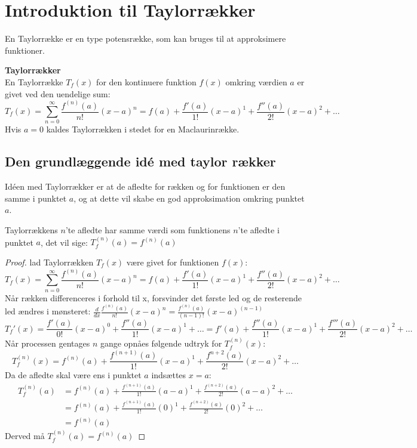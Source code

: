 \chapter{Introduktion til Taylorrækker}
\label{ch:tr}
En Taylorrække er en type potensrække, som kan bruges til at approksimere funktioner.
\begin{defn}
    \textbf{Taylorrækker}\\
    En Taylorrække $T_f(x)$ for den kontinuere funktion $f(x)$ omkring værdien $a$ er givet ved den uendelige sum:
    \[
        T_f(x) = \sum^{\infty}_{n=0} \frac{f^{(n)}(a)}{n!} (x-a)^{n}
        = f(a) + \frac{f'(a)}{1!}(x-a)^{1} + \frac{f''(a)}{2!}(x-a)^{2} + \ldots
    \]
    Hvis $a = 0$ kaldes Taylorrækken i stedet for en Maclaurinrække.
\end{defn}
\section{Den grundlæggende idé med taylor rækker}
\label{def:taylorrække} Idéen med Taylorrækker er at de afledte for rækken og for funktionen er den samme i punktet $a$, 
og at dette vil skabe en god approksimation omkring punktet $a$. 
\begin{thm}
    Taylorrækkens $n$'te afledte har samme værdi som funktionens $n$'te afledte i punktet $a$, 
    det vil sige: $T_f^{(n)}(a) = f^{(n)} (a)$
\end{thm}
\begin{proof}
    lad Taylorrækken $T_f(x)$ være givet for funktionen $f(x)$: 
    \[
        T_f(x) = \sum^{\infty}_{n=0} \frac{f^{(n)}(a)}{n!} (x-a)^{n}
        = f(a) + \frac{f'(a)}{1!}(x-a)^{1} + \frac{f''(a)}{2!}(x-a)^{2} + \ldots
    \]
    Når rækken differenceres i forhold til x, forsvinder det første led og de resterende led ændres i mønsteret: $\frac{d}{dx} \frac{f^{(n)}(a)}{n!} (x-a)^{n} = \frac{f^{(n)}(a)}{(n-1)!} (x-a)^{(n - 1)}$ %
    \[
        T_f'(x) = \frac{f'(a)}{0!}(x-a)^0 + \frac{f''(a)}{1!}(x-a)^{1} + \ldots = f'(a) + \frac{f''(a)}{1!}(x-a)^{1} + \frac{f'''(a)}{2!}(x-a)^{2} + \ldots
    \]
    Når processen gentages $n$ gange opnåes følgende udtryk for $T_f^{(n)}(x)$:
    \[
        T_f^{(n)}(x) = f^{(n)}(a) + \frac{f^{(n + 1)}(a)}{1!}(x-a)^{1} + \frac{f^{n + 2}(a)}{2!}(x-a)^{2} + \ldots
    \]
    Da de afledte skal være ens i punktet $a$ indsættes $x = a$:
    \begin{align*}
        T_f^{(n)}(a) &= f^{(n)}(a) + \frac{f^{(n + 1)}(a)}{1!}(a-a)^{1} + \frac{f^{(n + 2)}(a)}{2!}(a-a)^{2} + \ldots \\
                   &= f^{(n)}(a) + \frac{f^{(n + 1)}(a)}{1!}(0)^{1} + \frac{f^{(n + 2)}(a)}{2!}(0)^{2} + \ldots \\
                   &= f^{(n)}(a)        
    \end{align*}
    Derved må $T_f^{(n)}(a) = f^{(n)}(a)$
\end{proof}
